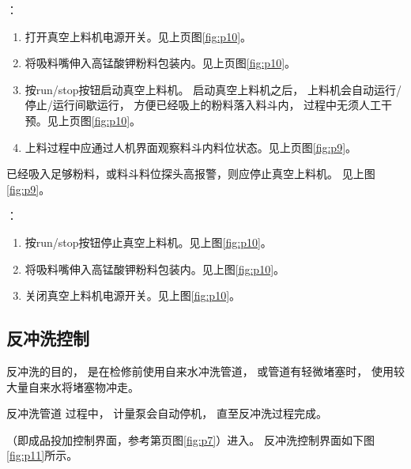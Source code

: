 \documentclass[UTF8,a4paper,12pt,titlepage]{ctexart}
\begin{document}
         ：
         \begin{enumerate}
            \item 打开真空上料机电源开关。见上页图\ref{fig:p10}。
            \item 将吸料嘴伸入高锰酸钾粉料包装内。见上页图\ref{fig:p10}。
            \item 按run/stop按钮启动真空上料机。
            启动真空上料机之后，
            上料机会自动运行/停止/运行间歇运行，
            方便已经吸上的粉料落入料斗内，
            过程中无须人工干预。见上页图\ref{fig:p10}。
            \item 上料过程中应通过人机界面观察料斗内料位状态。见上页图\ref{fig:p9}。
         \end{enumerate}

            已经吸入足够粉料，或料斗料位探头高报警，则应停止真空上料机。
            见上图\ref{fig:p9}。

         ：
         \begin{enumerate}
            \item 按run/stop按钮停止真空上料机。见上图\ref{fig:p10}。
            \item 将吸料嘴伸入高锰酸钾粉料包装内。见上图\ref{fig:p10}。
            \item 关闭真空上料机电源开关。见上图\ref{fig:p10}。
         \end{enumerate}

     \subsection{反冲洗控制}
        反冲洗的目的，
        是在检修前使用自来水冲洗管道，
        或管道有轻微堵塞时，
        使用较大量自来水将堵塞物冲走。

         反冲洗管道 过程中，
        计量泵会自动停机，
        直至反冲洗过程完成。

       （即成品投加控制界面，参考第\pageref{fig:p7}页图\ref{fig:p7}）进入。
       反冲洗控制界面如下图\ref{fig:p11}所示。
\end{document}
